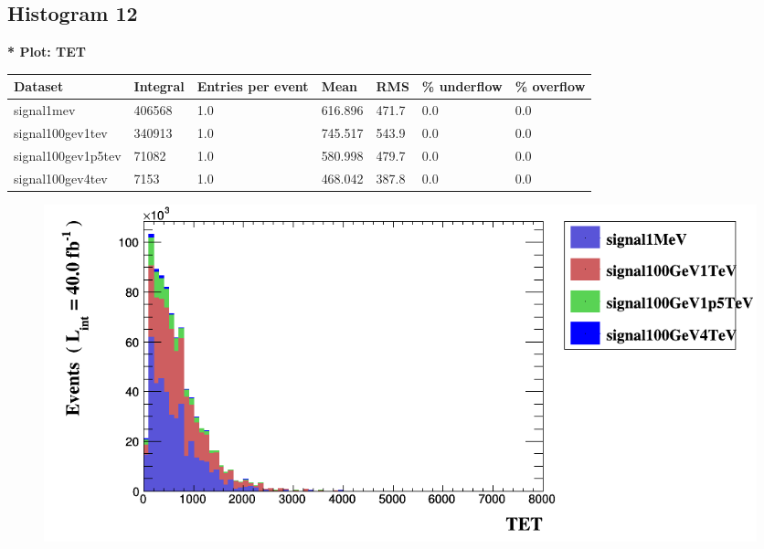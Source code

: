 \documentclass[a4paper, 10pt]{article}
\begin{document}
\subsection{ Histogram 12}

\textbf{* Plot: TET}\\
   \begin{table}[H]
  \begin{center}
    \begin{tabular}{|m{23.0mm}|m{23.0mm}|m{18.0mm}|m{19.0mm}|m{19.0mm}|m{19.0mm}|m{19.0mm}|}
      \hline
      {\cellcolor{yellow}         Dataset}& {\cellcolor{yellow}         Integral}& {\cellcolor{yellow}         Entries per event}& {\cellcolor{yellow}         Mean}& {\cellcolor{yellow}         RMS}& {\cellcolor{yellow}         \% underflow}& {\cellcolor{yellow}         \% overflow}\\
      \hline
      {\cellcolor{white}         signal1mev}& {\cellcolor{white}         406568}& {\cellcolor{white}         1.0}& {\cellcolor{white}         616.896}& {\cellcolor{white}         471.7}& {\cellcolor{green}         0.0}& {\cellcolor{green}         0.0}\\
      \hline
      {\cellcolor{white}         signal100gev1tev}& {\cellcolor{white}         340913}& {\cellcolor{white}         1.0}& {\cellcolor{white}         745.517}& {\cellcolor{white}         543.9}& {\cellcolor{green}         0.0}& {\cellcolor{green}         0.0}\\
      \hline
      {\cellcolor{white}         signal100gev1p5tev}& {\cellcolor{white}         71082}& {\cellcolor{white}         1.0}& {\cellcolor{white}         580.998}& {\cellcolor{white}         479.7}& {\cellcolor{green}         0.0}& {\cellcolor{green}         0.0}\\
      \hline
      {\cellcolor{white}         signal100gev4tev}& {\cellcolor{white}         7153}& {\cellcolor{white}         1.0}& {\cellcolor{white}         468.042}& {\cellcolor{white}         387.8}& {\cellcolor{green}         0.0}& {\cellcolor{green}         0.0}\\
\hline
    \end{tabular}
  \end{center}
\end{table}

\begin{figure}[H]
  \begin{center}
    \includegraphics[scale=0.45]{selection_11.png}\\
\caption{   }
  \end{center}
\end{figure}
      
\end{document}
